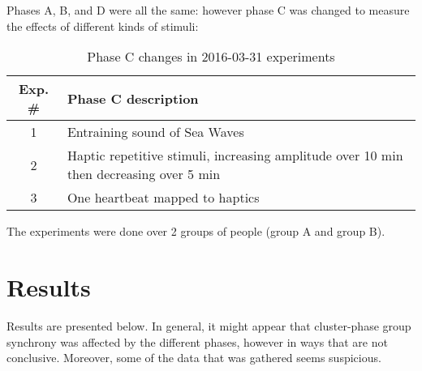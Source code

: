 \documentclass[a4paper,10pt]{article}
\begin{document}
Phases A, B, and D were all the same: however phase C was changed to measure the effects of different kinds of stimuli:

\begin{table}[h]
\caption{Phase C changes in 2016-03-31 experiments}
\begin{tabularx}{\textwidth}{|c|X|} \hline
Exp. \# & Phase C description\\\hline\hline 
1        & Entraining sound of Sea Waves\\\hline
2        & Haptic repetitive stimuli, increasing amplitude over 10 min then decreasing over 5 min\\\hline
3        & One heartbeat mapped to haptics\\\hline
\end{tabularx}
\end{table}

The experiments were done over 2 groups of people (group A and group B).

\section{Results}

Results are presented below. In general, it might appear that cluster-phase group synchrony was affected by the different phases, however in ways that are not conclusive. Moreover, some of the data that was gathered seems suspicious.

 
\end{document}
